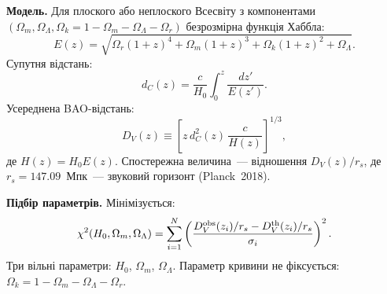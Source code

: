 \documentclass{article}
\title{}
\date{}
\begin{document}
\textbf{Модель.}
Для плоского або не\-плоского Всесвіту з компонентами
$(\Omega_m, \Omega_\Lambda, \Omega_k = 1 - \Omega_m - \Omega_\Lambda - \Omega_r)$
безрозмірна функція Хаббла:
\begin{equation}
  E(z) = \sqrt{\Omega_r(1+z)^4 + \Omega_m(1+z)^3
               + \Omega_k(1+z)^2 + \Omega_\Lambda}.
\end{equation}
Супутня відстань:
\begin{equation}
  d_C(z) = \frac{c}{H_0}\int_0^z \frac{dz'}{E(z')}.
\end{equation}
Усереднена BAO-відстань:
\begin{equation}
  D_V(z) \equiv \left[z\,d_C^2(z)\,\frac{c}{H(z)}\right]^{1/3},
\end{equation}
де $H(z) = H_0 E(z)$.
Спостережна величина~--- відношення $D_V(z)/r_s$,
де $r_s = 147.09$~Мпк~--- звуковий горизонт (Planck~2018).

\textbf{Підбір параметрів.}
Мінімізується:
\begin{equation}
  \chi^2(H_0, \Omega_m, \Omega_\Lambda)
  = \sum_{i=1}^{N}
    \left(\frac{D_V^{\rm obs}(z_i)/r_s
               - D_V^{\rm th}(z_i)/r_s}{\sigma_i}\right)^2.
\end{equation}
Три вільні параметри: $H_0$, $\Omega_m$, $\Omega_\Lambda$.
Параметр кривини не фіксується: $\Omega_k = 1 - \Omega_m - \Omega_\Lambda - \Omega_r$.
\end{document}
